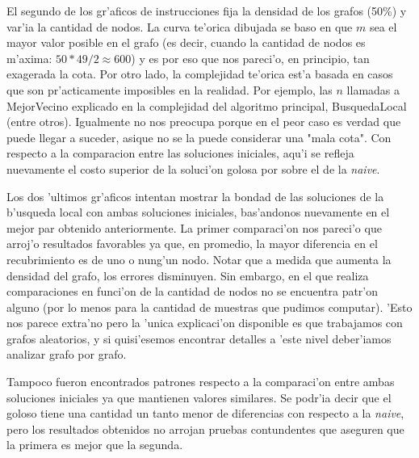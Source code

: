 El segundo de los gr'aficos de instrucciones fija la densidad de los grafos (50\%) y var'ia la cantidad de nodos. La curva te'orica dibujada se baso en que $m$ sea el mayor valor posible en el grafo (es decir, cuando la cantidad de nodos es m'axima: $50*49/2 \approx 600$) y es por eso que nos pareci'o, en principio, tan exagerada la cota. Por otro lado, la complejidad te'orica est'a basada en casos que son pr'acticamente imposibles en la realidad. Por ejemplo, las $n$ llamadas a MejorVecino explicado en la complejidad del algoritmo principal, BusquedaLocal (entre otros). Igualmente no nos preocupa porque en el peor caso es verdad que puede llegar a suceder, asique no se la puede considerar una "mala cota". Con respecto a la comparacion entre las soluciones iniciales, aqu'i se refleja nuevamente el costo superior de la soluci'on golosa por sobre el de la \emph{naive}.

Los dos 'ultimos gr'aficos intentan mostrar la bondad de las soluciones de la b'usqueda local con ambas soluciones iniciales, bas'andonos nuevamente en el mejor par obtenido anteriormente. La primer comparaci'on nos pareci'o que arroj'o resultados favorables ya que, en promedio, la mayor diferencia en el recubrimiento es de uno o nung'un nodo. Notar que a medida que aumenta la densidad del grafo, los errores disminuyen. Sin embargo, en el que realiza comparaciones en funci'on de la cantidad de nodos no se encuentra patr'on alguno (por lo menos para la cantidad de muestras que pudimos computar). 'Esto nos parece extra'no pero la 'unica explicaci'on disponible es que trabajamos con grafos aleatorios, y si quisi'esemos encontrar detalles a 'este nivel deber'iamos analizar grafo por grafo.

Tampoco fueron encontrados patrones respecto a la comparaci'on entre ambas soluciones iniciales ya que mantienen valores similares. Se podr'ia decir que el goloso tiene una cantidad un tanto menor de diferencias con respecto a la \emph{naive}, pero los resultados obtenidos no arrojan pruebas contundentes que aseguren que la primera es mejor que la segunda.

